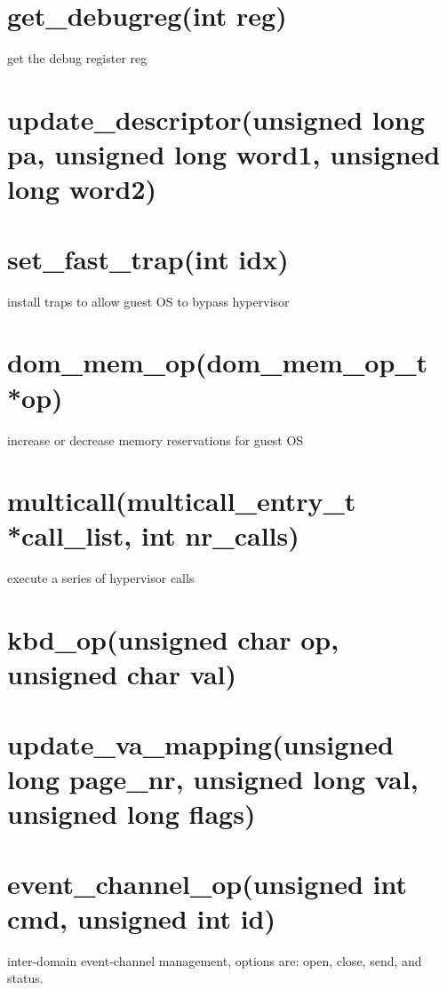 \documentclass[11pt,twoside,final,openright]{xenstyle}
\begin{document}
\section{ get\_debugreg(int reg)}
 get the debug register reg

\section{ update\_descriptor(unsigned long pa, unsigned long word1, unsigned long word2)} 

\section{ set\_fast\_trap(int idx)}
 install traps to allow guest OS to bypass hypervisor

\section{ dom\_mem\_op(dom\_mem\_op\_t *op)}
 increase or decrease memory reservations for guest OS

\section{ multicall(multicall\_entry\_t *call\_list, int nr\_calls)}
 execute a series of hypervisor calls

\section{ kbd\_op(unsigned char op, unsigned char val)}

\section{update\_va\_mapping(unsigned long page\_nr, unsigned long val, unsigned long flags)}

\section{ event\_channel\_op(unsigned int cmd, unsigned int id)} 
inter-domain event-channel management, options are: open, close, send, and status.
\end{document}
